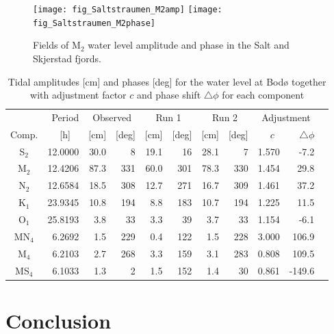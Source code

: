 \begin{figure}[!t]
\centering
\texttt{[image: fig\_Saltstraumen\_M2amp]}
\texttt{[image: fig\_Saltstraumen\_M2phase]}
\caption{Fields of M$_2$ water level amplitude and phase in the Salt and Skjerstad fjords.}
\label{fig:Saltstraumen_field}
\end{figure}

\begin{table}[ht]
\caption{Tidal amplitudes [cm] and phases [deg] for the water level at Bod{\o} together with adjustment factor $c$ and phase shift $\triangle \phi$ for each component}
\label{tab:Bodo}
\centering
\begin{tabular}{crrrrrrrrrr} \hline
      & Period & \multicolumn{2}{c}{Observed} & \multicolumn{2}{c}{Run 1} & \multicolumn{2}{c}{Run 2} & \multicolumn{2}{c}{Adjustment} \\
Comp. & [h] $\;\;$ & [cm] & [deg] & [cm] & [deg] & [cm] & [deg] & $c\;\;$ & $\triangle \phi$  \\ \hline 
S$_2$   & 12.0000  &  30.0 &      8   &  19.1 &     16   &  28.1 &      7    &   1.570  &    -7.2   \\ 
M$_2$   & 12.4206  &  87.3 &    331   &  60.0 &    301   &  78.3 &    330    &   1.454  &    29.8   \\ 
N$_2$   & 12.6584  &  18.5 &    308   &  12.7 &    271   &  16.7 &    309    &   1.461  &    37.2   \\ 
K$_1$   & 23.9345  &  10.8 &    194   &   8.8 &    183   &  10.7 &    194    &   1.225  &    11.5   \\ 
O$_1$   & 25.8193  &   3.8 &     33   &   3.3 &     39   &   3.7 &     33    &   1.154  &    -6.1   \\ 
MN$_4$  &  6.2692  &   1.5 &    229   &   0.4 &    122   &   1.5 &    228    &   3.000  &   106.9   \\ 
M$_4$   &  6.2103  &   2.7 &    268   &   3.3 &    159   &   3.1 &    283    &   0.808  &   109.5   \\ 
MS$_4$  &  6.1033  &   1.3 &      2   &   1.5 &    152   &   1.4 &     30    &   0.861  &  -149.6   \\ \hline
\end{tabular}
\end{table}


\section{Conclusion}

